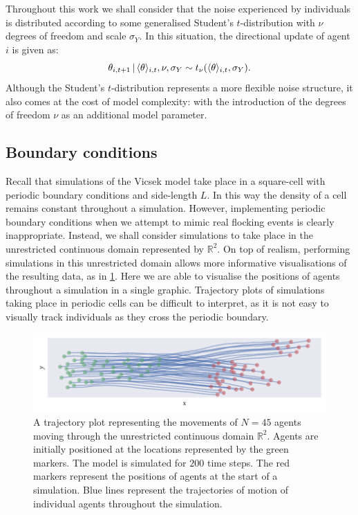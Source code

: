 Throughout this work we shall consider that the noise experienced by
individuals is distributed according to some generalised Student's
$t$-distribution with $\nu$ degrees of freedom and scale $\sigma_Y$. In this
situation, the directional update of agent $i$ is given as:
\begin{equation}
  \label{eq:students_update}
  \theta_{i,t+1} \,|\, \langle\theta\rangle_{i,t}, \nu, \sigma_Y \sim
     t_{\nu}(\langle\theta\rangle_{i,t}, \sigma_Y).
\end{equation}
Although the Student's $t$-distribution represents a more flexible noise
structure, it also comes at the cost of model complexity: with the introduction
of the degrees of freedom $\nu$ as an additional model parameter.

\subsection{Boundary conditions}

Recall that simulations of the Vicsek model take place in a square-cell with
periodic boundary conditions and side-length $L$. In this way the density of a
cell remains constant throughout a simulation. However, implementing periodic
boundary conditions when we attempt to mimic real flocking events is clearly
inappropriate. Instead, we shall consider simulations to take place in the
unrestricted continuous domain represented by $\mathbb{R}^2$. On top of
realism, performing simulations in this unrestricted domain allows more
informative visualisations of the resulting data, as in
\cref{fig:example_traj}. Here we are able to visualise the positions of agents
throughout a simulation in a single graphic. Trajectory plots of simulations
taking place in periodic cells can be difficult to interpret, as it is not easy
to visually track individuals as they cross the periodic boundary.

\begin{figure}[tb]
  \includegraphics{example_traj_plot.pdf}
  \caption{A trajectory plot representing the movements of $N=45$ agents
    moving through the unrestricted continuous domain $\mathbb{R}^2$.
    Agents are initially positioned at the locations represented by the green
    markers. The model is simulated for $200$ time steps. The red markers
    represent the positions of agents at the start of a simulation. Blue lines
    represent the trajectories of motion of individual agents throughout the
    simulation.}
    \label{fig:example_traj}
\end{figure}

